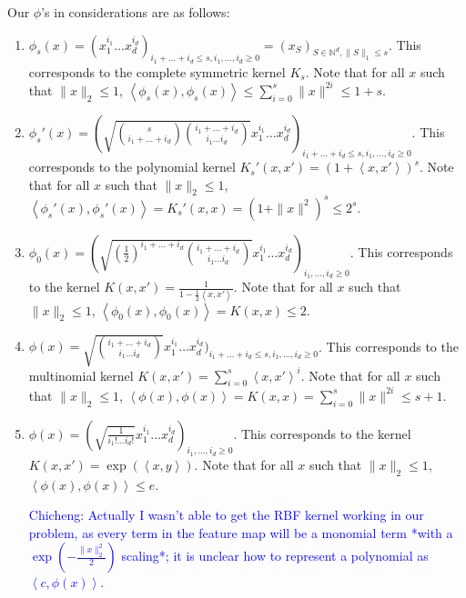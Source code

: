 \documentclass{article}
\newcommand{\field}[1]{\mathbb{#1}}
\newcommand{\fN}{\field{N}}
\newcommand{\inner}[1]{ \left\langle {#1} \right\rangle }
\newcommand{\cz}[1]{\textcolor{blue}{Chicheng: #1}}
\begin{document}
Our $\phi$'s in considerations are as follows:
\begin{enumerate}
\item $\phi_{s}(x) = ( x_1^{i_1} \ldots x_d^{i_d})_{i_1 + \ldots + i_d \leq s, i_1, \ldots, i_d \geq 0} = (x_S)_{S \in \fN^d, \|S\|_1 \leq s}$. This corresponds to the complete symmetric kernel $K_s$. Note that for all $x$ such that $\| x \|_2 \leq 1$,
$\inner{\phi_{s}(x), \phi_{s}(x)} \leq \sum_{i=0}^s \|x\|^{2i} \leq 1 + s$.

\item $\phi_{s}'(x) = ( \sqrt{ {s \choose i_1+\ldots+i_d} {i_1+\ldots+i_d \choose i_1 \ldots i_d}}  x_1^{i_1} \ldots x_d^{i_d})_{i_1 + \ldots + i_d \leq s, i_1, \ldots, i_d \geq 0}$. This corresponds to the polynomial kernel
$K_s'(x,x') = (1 + \inner{x, x'})^s$. Note that for all $x$ such that $\| x \|_2 \leq 1$,
$\inner{\phi_s'(x), \phi_s'(x)} = K_s'(x,x) = (1 + \|x\|^2)^s \leq 2^s$.

\item $\phi_0(x) = ( \sqrt{ (\frac 1 2)^{i_1+\ldots+i_d} {i_1+\ldots+i_d \choose i_1 \ldots i_d}}  x_1^{i_1} \ldots x_d^{i_d})_{i_1, \ldots, i_d \geq 0}$. This corresponds to the kernel $K(x,x') = \frac{1}{1 - \frac 1 2 \inner{x,x'}}$.
Note that for all $x$ such that $\| x \|_2 \leq 1$,
$\inner{\phi_0(x), \phi_0(x)} = K(x,x) \leq 2$.

\item $\phi(x) = \sqrt{{i_1+\ldots+i_d \choose i_1 \ldots i_d}} x_1^{i_1} \ldots x_d^{i_d})_{i_1 + \ldots + i_d \leq s, i_1, \ldots, i_d \geq 0}$. This corresponds to the multinomial kernel $K(x,x') = \sum_{i=0}^s \inner{x,x'}^i$. Note that for all $x$ such that $\| x \|_2 \leq 1$,
$\inner{\phi(x), \phi(x)} = K(x,x) = \sum_{i=0}^s \|x\|^{2i} \leq s+1$.

\item $\phi(x) = (\sqrt{\frac{1}{i_1! \ldots i_d!}} x_1^{i_1} \ldots x_d^{i_d})_{i_1, \ldots, i_d \geq 0}$. This corresponds to the kernel $K(x,x') = \exp(\inner{x,y})$. Note that for all $x$ such that $\|x\|_2 \leq 1$, $\inner{\phi(x), \phi(x)} \leq e$.

\cz{Actually I wasn't able to get the RBF kernel working in our problem, as every term in the feature map will be a monomial term *with a $\exp(-\frac{\|x\|_2^2}{2})$ scaling*; it is unclear how to represent a polynomial as $\inner{c, \phi(x)}$.}

\end{enumerate}
\end{document}
